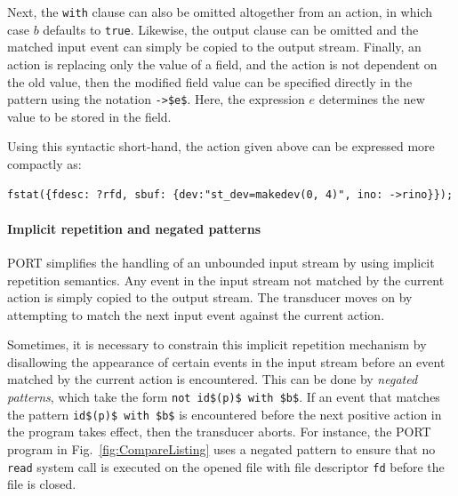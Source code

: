 Next, the \lstinline+with+ clause can also be omitted altogether from an action, in which case $b$ defaults to \lstinline+true+. Likewise, the output clause can be omitted and the matched input event can simply be copied to the output stream. Finally, an action is replacing only the value of a field, and the action is not dependent on the old value, then the modified field value can be specified directly in the pattern using the notation \lstinline+->$e$+. Here, the expression $e$ determines the new value to be stored in the field.

Using this syntactic short-hand, the action given above can be expressed more compactly as:
\begin{lstlisting}[numbers=none,xleftmargin=0em,gobble=2]
  fstat({fdesc: ?rfd, sbuf: {dev:"st_dev=makedev(0, 4)", ino: ->rino}});
\end{lstlisting}


\paragraph*{Implicit repetition and negated patterns}

PORT simplifies the handling of an unbounded input stream by using implicit repetition semantics.
Any event in the input stream not matched by the current action is simply copied to the output stream. The transducer moves on by attempting to match the next input event against the current action.

Sometimes, it is necessary to constrain this implicit repetition mechanism by disallowing the appearance of certain events in the input stream before an event  matched by the current action is encountered.  This can be done by \emph{negated patterns}, which take the form \lstinline+not id$(p)$ with $b$+. If an event that matches the pattern \lstinline+id$(p)$ with $b$+ is encountered before the next positive action in the program takes effect, then the transducer aborts. For instance, the PORT program in Fig.~\ref{fig:CompareListing} uses a negated pattern to ensure that no \lstinline+read+ system call is executed on the opened file with file descriptor \lstinline+fd+ before the file is closed.

